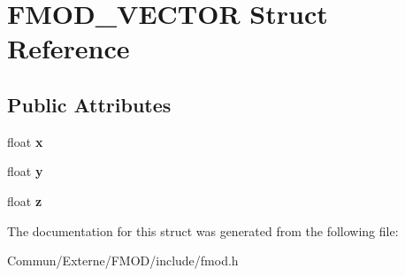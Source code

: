 \hypertarget{struct_f_m_o_d___v_e_c_t_o_r}{}\section{F\+M\+O\+D\+\_\+\+V\+E\+C\+T\+OR Struct Reference}
\label{struct_f_m_o_d___v_e_c_t_o_r}
\subsection*{Public Attributes}
\begin{DoxyCompactItemize}
\item 
float {\bfseries x}\hypertarget{struct_f_m_o_d___v_e_c_t_o_r_afe9fad8ce812c3cfc021c25bbb8bc0e8}{}\label{struct_f_m_o_d___v_e_c_t_o_r_afe9fad8ce812c3cfc021c25bbb8bc0e8}

\item 
float {\bfseries y}\hypertarget{struct_f_m_o_d___v_e_c_t_o_r_abea7feb26ece298baa766f821b8686ff}{}\label{struct_f_m_o_d___v_e_c_t_o_r_abea7feb26ece298baa766f821b8686ff}

\item 
float {\bfseries z}\hypertarget{struct_f_m_o_d___v_e_c_t_o_r_ab64088b1bd2e695bd1abc6b370b71796}{}\label{struct_f_m_o_d___v_e_c_t_o_r_ab64088b1bd2e695bd1abc6b370b71796}

\end{DoxyCompactItemize}


The documentation for this struct was generated from the following file\+:\begin{DoxyCompactItemize}
\item 
Commun/\+Externe/\+F\+M\+O\+D/include/fmod.\+h\end{DoxyCompactItemize}
